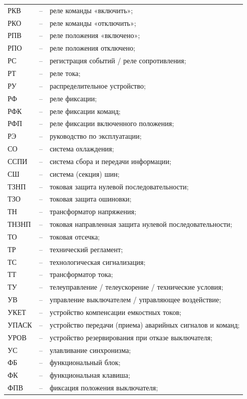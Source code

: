 \begin{longtable}{>{\raggedright\arraybackslash}m{2cm}>{\raggedright\arraybackslash}m{0.5cm}>{\raggedright\arraybackslash}m{20cm}}
РКВ & -- & реле команды «включить»; \\
РКО & -- & реле команды «отключить»; \\
РПВ & -- & реле положения «включено»; \\
РПО & -- & реле положения отключено; \\
РС & -- & регистрация событий / реле сопротивления; \\
РТ & -- & реле тока; \\
РУ & -- & распределительное устройство; \\
РФ & -- & реле фиксации; \\
РФК & -- & реле фиксации команд; \\
РФП & -- & реле фиксации включенного положения; \\
РЭ & -- & руководство по эксплуатации; \\
СО & -- & система охлаждения; \\
ССПИ & -- & система сбора и передачи информации; \\
СШ & -- & система (секция) шин; \\
ТЗНП & -- & токовая защита нулевой последовательности; \\
ТЗО & -- & токовая защита ошиновки; \\
ТН & -- & трансформатор напряжения; \\
ТНЗНП & -- & токовая направленная защита нулевой последовательности; \\
ТО & -- & токовая отсечка; \\
ТР & -- & технический регламент; \\
ТС & -- & технологическая сигнализация; \\
ТТ & -- & трансформатор тока; \\
ТУ & -- & телеуправление / телеускорение / технические условия; \\
УВ & -- & управление выключателем / управляющее воздействие; \\
УКЕТ & -- & устройство компенсации емкостных токов; \\
УПАСК & -- & устройство передачи (приема) аварийных сигналов и команд; \\
УРОВ & -- & устройство резервирования при отказе выключателя; \\
УС & -- & улавливание синхронизма; \\
ФБ & -- & функциональный блок; \\
ФК & -- & функциональная клавиша; \\
ФПВ & -- & фиксация положения выключателя; \\

\end{longtable}
